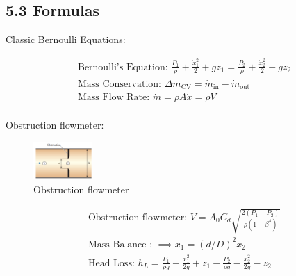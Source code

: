 \subsection*{5.3 Formulas}
Classic Bernoulli Equations:
\begin{fleqn}
    \begin{align*}
        &\text{Bernoulli's Equation: } \frac{P_1}{\rho} + \frac{\dot{x}_1^2}{2} + gz_1 = \frac{P_2}{\rho} + \frac{\dot{x}_2^2}{2} + gz_2 \\
        &\text{Mass Conservation: } \Delta m_{\text{CV}} = \dot{m}_{\text{in}} - \dot{m}_{\text{out}} \\
        &\text{Mass Flow Rate: } \dot{m} = \rho A \dot{x} = \rho V \\
    \end{align*}
\end{fleqn}
Obstruction flowmeter:
\begin{figure}[H]
    \centering
    \includegraphics[width=0.2\textwidth]{Figures/Sec8 Obstruction Flowmeter.png}
    \caption{Obstruction flowmeter}
    \label{fig:obstruction_flowmeter}
\end{figure}
\begin{fleqn}
    \begin{align*}
        &\text{Obstruction flowmeter: } \dot{V} = A_0 C_d \sqrt{\frac{2(P_1 - P_2)}{\rho (1 - \beta^4)}} \\
        &\text{Mass Balance : } \implies \dot{x}_1 = (d/D)^2 \dot{x}_2 \\
        &\text{Head Loss: } h_L = \frac{P_1}{\rho g} + \frac{\dot{x}_1^2}{2g} + z_1 - \frac{P_2}{\rho g} - \frac{\dot{x}_2^2}{2g} - z_2 \\
    \end{align*}
\end{fleqn}
